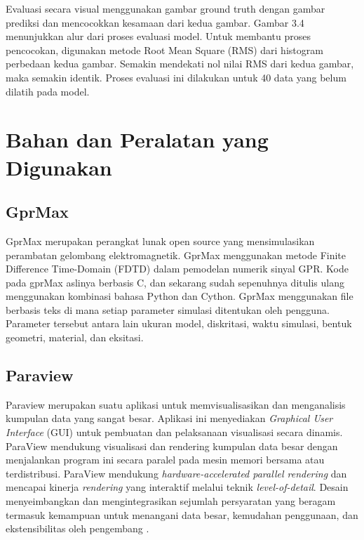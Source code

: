Evaluasi secara visual menggunakan gambar ground truth dengan gambar prediksi dan mencocokkan kesamaan dari kedua gambar. 
Gambar 3.4 menunjukkan alur dari proses evaluasi model. 
Untuk membantu proses pencocokan, digunakan metode Root Mean Square (RMS) dari histogram perbedaan kedua gambar. 
Semakin mendekati nol nilai RMS dari kedua gambar, maka semakin identik. 
Proses evaluasi ini dilakukan untuk 40 data yang belum dilatih pada model.

\section{Bahan dan Peralatan yang Digunakan}
\label{sec:bahanPeralatan}

\subsection{GprMax}
\label{subsec:GprMax}

GprMax merupakan perangkat lunak open source yang mensimulasikan perambatan gelombang elektromagnetik. 
GprMax menggunakan metode Finite Difference Time-Domain (FDTD) dalam pemodelan numerik sinyal GPR. 
Kode pada gprMax aslinya berbasis C, dan sekarang sudah sepenuhnya ditulis ulang menggunakan kombinasi bahasa Python dan Cython. 
GprMax menggunakan file berbasis teks di mana setiap parameter simulasi ditentukan oleh pengguna. 
Parameter tersebut antara lain ukuran model, diskritasi, waktu simulasi, bentuk geometri, material, dan eksitasi.

\subsection{Paraview}
\label{paraview}

Paraview merupakan suatu aplikasi untuk memvisualisasikan dan menganalisis kumpulan data yang sangat besar.
Aplikasi ini menyediakan \emph{Graphical User Interface} (GUI) untuk pembuatan dan pelaksanaan visualisasi secara dinamis.
ParaView mendukung visualisasi dan rendering kumpulan data besar dengan menjalankan program ini secara paralel pada mesin memori bersama atau terdistribusi. 
ParaView mendukung \emph{hardware-accelerated parallel rendering} dan mencapai kinerja \emph{rendering} yang interaktif melalui teknik \emph{level-of-detail}.
Desain menyeimbangkan dan mengintegrasikan sejumlah persyaratan yang beragam termasuk kemampuan untuk menangani data besar, kemudahan penggunaan, dan ekstensibilitas oleh pengembang \parencite{paraview}.

